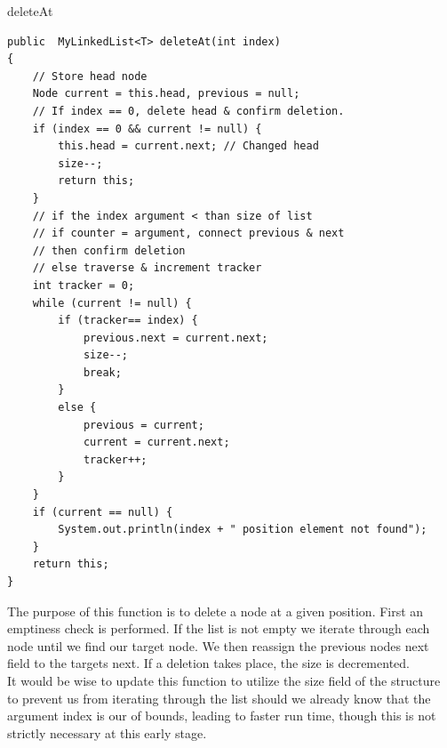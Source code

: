 \documentclass[a4paper]{article}
\begin{document}
\vspace*{0pt}
\begin{algorithm}
\caption{deleteAt}\label{euclid}

\begin{verbatim}
public  MyLinkedList<T> deleteAt(int index)
{
    // Store head node
    Node current = this.head, previous = null;
    // If index == 0, delete head & confirm deletion.
    if (index == 0 && current != null) {
        this.head = current.next; // Changed head
        size--;
        return this;
    }
    // if the index argument < than size of list
    // if counter = argument, connect previous & next
    // then confirm deletion
    // else traverse & increment tracker
    int tracker = 0;
    while (current != null) {
        if (tracker== index) {
            previous.next = current.next;
            size--;
            break;
        }
        else {
            previous = current;
            current = current.next;
            tracker++;
        }
    }
    if (current == null) {
        System.out.println(index + " position element not found");
    }
    return this;
}
\end{verbatim}
\end{algorithm}
The purpose of this function is to delete a node at a given position.
First an emptiness check is performed. If the list is not empty
we iterate through each node until we find our target node. 
We then reassign the previous nodes next field to the targets next.
If a deletion takes place, the size is decremented. \\

It would be wise to update this function to utilize the size field
of the structure to prevent us from iterating through the list 
should we already know that the argument index is our of bounds,
leading to faster run time, though this is not strictly
necessary at this early stage.

\newpage
\end{document}
